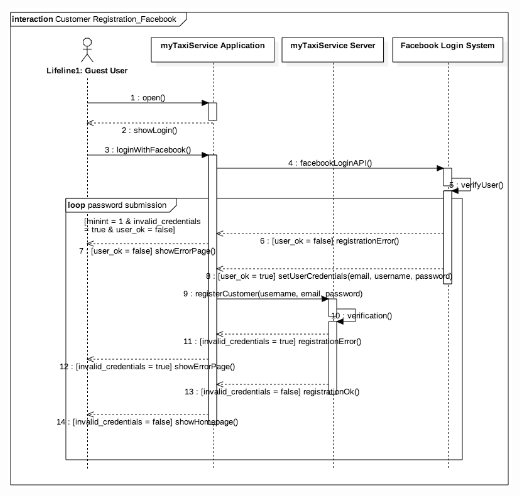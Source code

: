 				\begin{center}
					\includegraphics[scale=0.5]{IMG/InteractionDiagrams/CustomerRegistration_Facebook.png}
				\end{center}